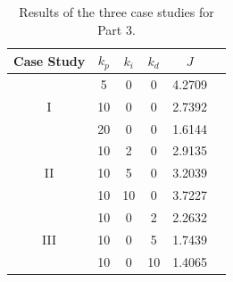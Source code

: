 \documentclass{article}
\begin{document}
\begin{table}[H]
    \centering
    \begin{tabular}{|c|c|c|c||c|c|}
        \hline
         Case Study & $k_p$ & $k_i$ & $k_d$ & $J$  \\
        \hline\hline
        \multirow{3}{*}{I} &  5 & 0 & 0  & 4.2709 \\
                           & 10 & 0 & 0  & 2.7392\\
                           & 20 & 0 & 0  & 1.6144\\
        \hline
        \multirow{3}{*}{II} & 10 &  2 & 0 & 2.9135 \\
                            & 10 &  5 & 0 & 3.2039 \\
                            & 10 & 10 & 0 & 3.7227 \\
        \hline
        \multirow{3}{*}{III} & 10 & 0 &  2 & 2.2632 \\
                             & 10 & 0 &  5 & 1.7439 \\
                             & 10 & 0 & 10 & 1.4065 \\
        \hline
    \end{tabular}
    \caption{Results of the three case studies for Part 3.}
    \label{tab:part-3}
\end{table}
    
\end{document}
